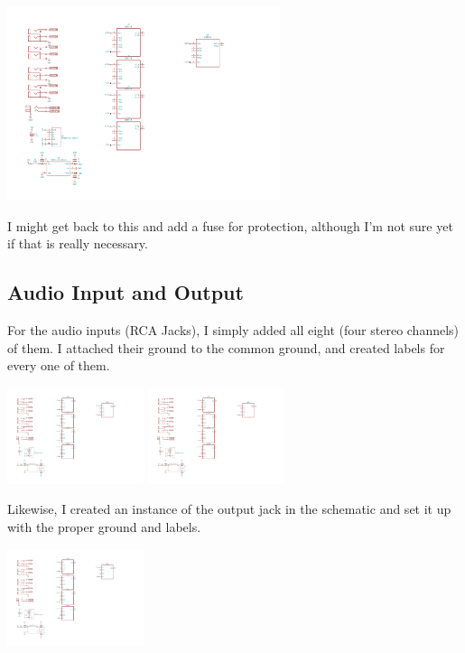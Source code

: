 \documentclass[a4paper]{article}
\begin{document}
\begin{center}
  \includegraphics[trim={2cm 5.5cm 21cm 12.8cm},width=8cm,clip]{images/audio-mixer.pdf}
\end{center}

I might get back to this and add a fuse for protection, although I'm not sure yet if that is really necessary.

\subsection{Audio Input and Output}

For the audio inputs (RCA Jacks), I simply added all eight (four stereo channels) of them. I attached their ground to the common ground, and created labels for every one of them.

\begin{center}
  \includegraphics[trim={2cm 14.7cm 24cm 2cm},width=4cm,clip]{images/audio-mixer.pdf}
  \includegraphics[trim={2cm 10.5cm 24cm 6.2cm},width=4cm,clip]{images/audio-mixer.pdf}
\end{center}

Likewise, I created an instance of the output jack in the schematic and set it up with the proper ground and labels.

\begin{center}
  \includegraphics[trim={2cm 8.5cm 24cm 10.4cm},width=4cm,clip]{images/audio-mixer.pdf}
\end{center}
\end{document}
